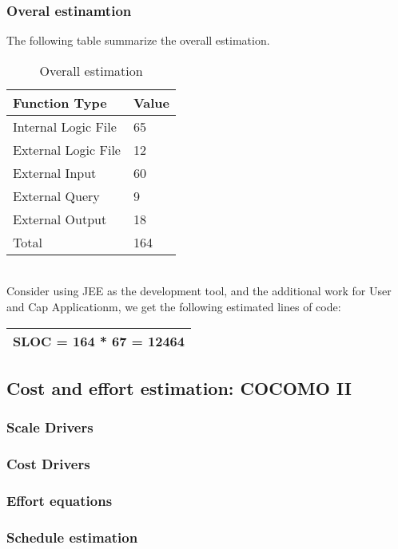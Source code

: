 \documentclass{article}
\begin{document}
	\subsubsection{Overal estinamtion}
	The following table summarize the overall estimation. \\
	\begin{table}[h]
		\centering
		\caption{Overall estimation}
		\label{my-label}
		\begin{tabular}{|l|l|}
			\hline
			Function Type       & Value \\ \hline
			Internal Logic File & 65    \\ \hline
			External Logic File & 12    \\ \hline
			External Input      & 60    \\ \hline
			External Query      & 9     \\ \hline
			External Output     & 18    \\ \hline
			Total               & 164   \\ \hline
		\end{tabular}
	\end{table}
\\Consider using JEE as the development tool, and the additional work for User and Cap Applicationm, we get the following estimated lines of code:
\begin{table}[h]
	\centering
	\label{my-label}
	\begin{tabular}{|l|}
		\hline
		SLOC = 164 * 67 = 12464 \\ \hline
	\end{tabular}
\end{table}

\newpage
\subsection{Cost and effort estimation: COCOMO II}
	\subsubsection{Scale Drivers}
	\subsubsection{Cost Drivers}
	\subsubsection{Effort equations}
	\subsubsection{Schedule estimation}
\newpage
\end{document}
